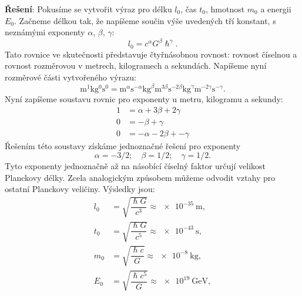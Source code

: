 \begin{mdframed}[style=mdexam]
\begin{example}
    \textbf{Řešení}: Pokusíme se vytvořit výraz pro délku \(l_0\), čas \(t_0\), hmotnost \(m_0\) a
    energii \(E_0\). Začneme délkou tak, že napíšeme součin výše uvedených tří konstant, s neznámými
    exponenty \(α\), \(β\), \(γ\): 
    \begin{equation*}
      l_0 = c^αG^β\hslash^γ.
    \end{equation*}
    Tato rovnice ve skutečnosti představuje čtyřnásobnou rovnost: rovnost číselnou a rovnost
    rozměrovou v metrech, kilogramech a sekundách. Napíšeme nyní rozměrové části vytvořeného výrazu:
    \begin{equation*}
      \mathrm{m^1kg^0s^0} = \si{\m}^α\si{\s}^{-α}                   %
                            \si{\kg}^{β}\si{\m}^{3β}\si{\s}^{-2β}   %
                            \si{\kg}^γ\si{\m}^{-2γ}\si{\s}^{-γ}.     %
    \end{equation*}
    Nyní zapíšeme soustavu rovnic pro exponenty u metru, kilogramu a sekundy:
    \begin{align*}
      1 &=   α + 3β + 2γ    \\
      0 &=     -  β +  γ    \\
      0 &= - α - 2β + -γ    
    \end{align*}
    Řešením této soustavy získáme jednoznačné řešení pro exponenty
    \begin{equation*}
      α =−3/2;\quad β=1/2;\quad γ=1/2. 
    \end{equation*}
    Tyto exponenty jednoznačně až na násobící číselný faktor určují velikost Planckovy délky. Zcela
    analogickým způsobem můžeme odvodit vztahy pro ostatní Planckovy veličiny. Výsledky jsou:
    \begin{subequations}\label{fyz:eq750} 
      \begin{align}
        l_0&=\sqrt{\dfrac{\hslash G}{c^3}}\approx \SI{e-35}{\m},               \label{fyz:eq750a}\\
        t_0&=\sqrt{\dfrac{\hslash G}{c^5}}\approx \SI{e-43}{\s},               \label{fyz:eq750b}\\
        m_0&=\sqrt{\dfrac{\hslash c}{G}}  \approx \SI{e-8}{\kg},               \label{fyz:eq750c}\\
        E_0&=\sqrt{\dfrac{\hslash c^5}{G}}\approx \SI{e19}{\giga\electronvolt},\label{fyz:eq750d}
      \end{align}
    \end{subequations} 
  \end{example}
\end{mdframed}